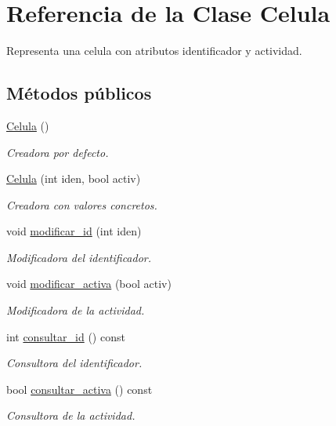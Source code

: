 \hypertarget{class_celula}{\section{Referencia de la Clase Celula}
\label{class_celula}
}


Representa una celula con atributos identificador y actividad.  


\subsection*{Métodos públicos}
\begin{DoxyCompactItemize}
\item 
\hyperlink{class_celula_a3c5017fbcec8cb564acc666aa7e21206}{Celula} ()
\begin{DoxyCompactList}\small\item\em Creadora por defecto. \end{DoxyCompactList}\item 
\hyperlink{class_celula_a9fac2a026e4205b7ca6f9c582d2bf5c0}{Celula} (int iden, bool activ)
\begin{DoxyCompactList}\small\item\em Creadora con valores concretos. \end{DoxyCompactList}\item 
void \hyperlink{class_celula_ad8549ea461baa63298e8548691a270e2}{modificar\-\_\-id} (int iden)
\begin{DoxyCompactList}\small\item\em Modificadora del identificador. \end{DoxyCompactList}\item 
void \hyperlink{class_celula_a5bccaca548ef9f6c06e06a64265fabe3}{modificar\-\_\-activa} (bool activ)
\begin{DoxyCompactList}\small\item\em Modificadora de la actividad. \end{DoxyCompactList}\item 
int \hyperlink{class_celula_adfe788cb113f6e8dcf9def377a248255}{consultar\-\_\-id} () const 
\begin{DoxyCompactList}\small\item\em Consultora del identificador. \end{DoxyCompactList}\item 
bool \hyperlink{class_celula_a750270ff8277447af6cc3a122d585aab}{consultar\-\_\-activa} () const 
\begin{DoxyCompactList}\small\item\em Consultora de la actividad. \end{DoxyCompactList}\item 

\end{DoxyCompactItemize}
